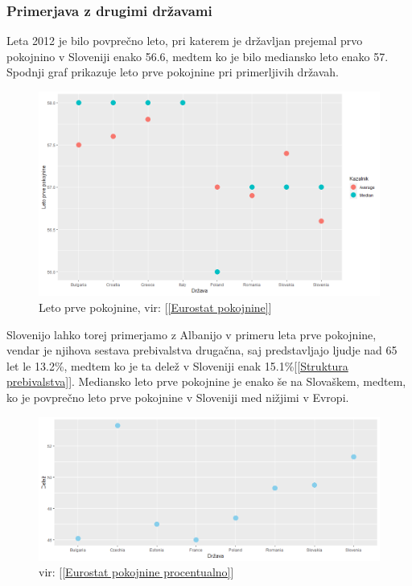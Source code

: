 \documentclass[12pt, a4paper]{article}
\begin{document}
\subsubsection[Primerjava z drugimi državami]{Primerjava z drugimi državami}
Leta 2012 je bilo povprečno leto, pri katerem je državljan prejemal prvo pokojnino v Sloveniji enako 56.6, medtem ko je bilo mediansko leto enako 57. Spodnji graf prikazuje leto prve pokojnine pri primerljivih državah.
\begin{figure}[h]
\centering
\includegraphics[height = 7 cm]{leto_prve_pokojnine.png}
\caption{Leto prve pokojnine, vir: [\ref{Eurostat pokojnine}]}
\label{Slika 2}
\end{figure}
Slovenijo lahko torej primerjamo z Albanijo v primeru leta prve pokojnine, vendar je njihova sestava prebivalstva drugačna, saj predstavljajo ljudje nad 65 let le 13.2\%, medtem ko je ta delež v Sloveniji enak 15.1\%[\ref{Struktura prebivalstva}]. Mediansko leto prve pokojnine je enako še na Slovaškem, medtem, ko je povprečno leto prve pokojnine v Sloveniji med nižjimi v Evropi.

\begin{figure}[h!]
\centering
\includegraphics[width = 13 cm]{graf_procentualno_pokojnina.png}
\caption{vir: [\ref{Eurostat pokojnine procentualno}]}
\label{Slika 3}
\end{figure}
\end{document}
